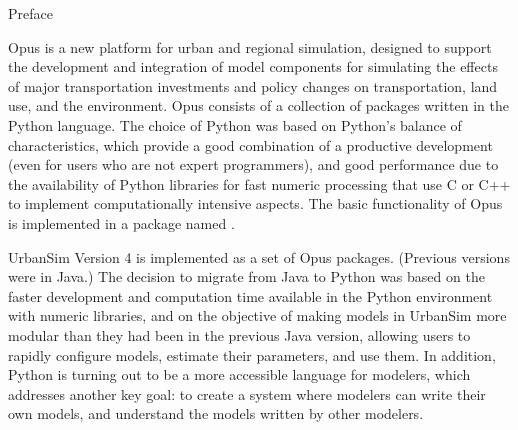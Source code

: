
{\huge Preface}
\label{preface}


Opus is a new platform for urban and regional simulation, designed to
support the development and integration of model
components  for simulating the
effects of major transportation investments and policy changes
on transportation,  land use, 
and the environment. 
Opus consists of a collection of packages 
written in the Python \pythonindex language. The choice of
Python \pythonindex was based on Python's \pythonindex
balance of characteristics, which provide a good combination of a
productive development (even for users who are not expert programmers), and
good performance  due to the availability of Python \pythonindex
libraries  for fast
numeric processing  that use C \cindex or C++ \cppindex
to implement computationally intensive
aspects.  The basic functionality of Opus is implemented in a package named .

UrbanSim Version 4  is implemented as a set of
Opus packages. (Previous versions  were in Java.) \javaindex
The decision to migrate from Java \javaindex to Python \pythonindex
was based on the faster development and computation time available
in the Python \pythonindex environment with numeric libraries, and on the objective of
making models  in UrbanSim more modular than they had been in the previous
Java \javaindex version, allowing users to rapidly configure models,  estimate their
parameters, and use them. In addition, Python \pythonindex is turning out to be a more
accessible language for modelers, which addresses another key goal:  to
create a system where modelers can write their own models, and understand
the models written by other modelers.


